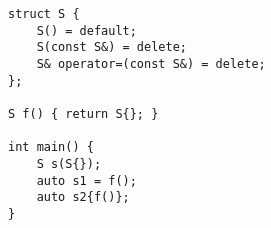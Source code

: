 \begin{lstlisting}[title=\href{https://godbolt.org/z/ThqjzP}{\texttt{godbolt.org/z/ThqjzP}}]
struct S {
    S() = default;
    S(const S&) = delete;
    S& operator=(const S&) = delete;
};

S f() { return S{}; }

int main() {
    S s(S{});
    auto s1 = f();
    auto s2{f()};
}
\end{lstlisting}
